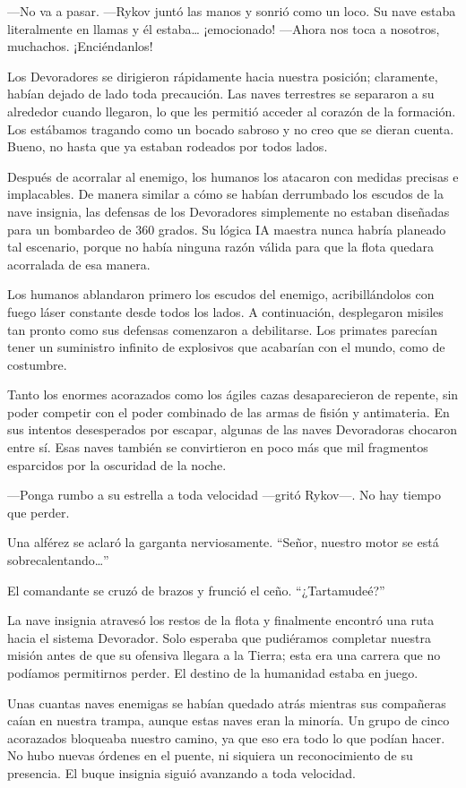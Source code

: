 —No va a pasar. —Rykov juntó las manos y sonrió como un loco. Su nave estaba literalmente en llamas y él estaba… ¡emocionado! —Ahora nos toca a nosotros, muchachos. ¡Enciéndanlos!

Los Devoradores se dirigieron rápidamente hacia nuestra posición; claramente, habían dejado de lado toda precaución. Las naves terrestres se separaron a su alrededor cuando llegaron, lo que les permitió acceder al corazón de la formación. Los estábamos tragando como un bocado sabroso y no creo que se dieran cuenta. Bueno, no hasta que ya estaban rodeados por todos lados.

Después de acorralar al enemigo, los humanos los atacaron con medidas precisas e implacables. De manera similar a cómo se habían derrumbado los escudos de la nave insignia, las defensas de los Devoradores simplemente no estaban diseñadas para un bombardeo de 360 grados. Su lógica IA maestra nunca habría planeado tal escenario, porque no había ninguna razón válida para que la flota quedara acorralada de esa manera.

Los humanos ablandaron primero los escudos del enemigo, acribillándolos con fuego láser constante desde todos los lados. A continuación, desplegaron misiles tan pronto como sus defensas comenzaron a debilitarse. Los primates parecían tener un suministro infinito de explosivos que acabarían con el mundo, como de costumbre.

Tanto los enormes acorazados como los ágiles cazas desaparecieron de repente, sin poder competir con el poder combinado de las armas de fisión y antimateria. En sus intentos desesperados por escapar, algunas de las naves Devoradoras chocaron entre sí. Esas naves también se convirtieron en poco más que mil fragmentos esparcidos por la oscuridad de la noche.

—Ponga rumbo a su estrella a toda velocidad —gritó Rykov—. No hay tiempo que perder.

Una alférez se aclaró la garganta nerviosamente. ``Señor, nuestro motor se está sobrecalentando…''

El comandante se cruzó de brazos y frunció el ceño. ``¿Tartamudeé?''

La nave insignia atravesó los restos de la flota y finalmente encontró una ruta hacia el sistema Devorador. Solo esperaba que pudiéramos completar nuestra misión antes de que su ofensiva llegara a la Tierra; esta era una carrera que no podíamos permitirnos perder. El destino de la humanidad estaba en juego.

Unas cuantas naves enemigas se habían quedado atrás mientras sus compañeras caían en nuestra trampa, aunque estas naves eran la minoría. Un grupo de cinco acorazados bloqueaba nuestro camino, ya que eso era todo lo que podían hacer. No hubo nuevas órdenes en el puente, ni siquiera un reconocimiento de su presencia. El buque insignia siguió avanzando a toda velocidad.

